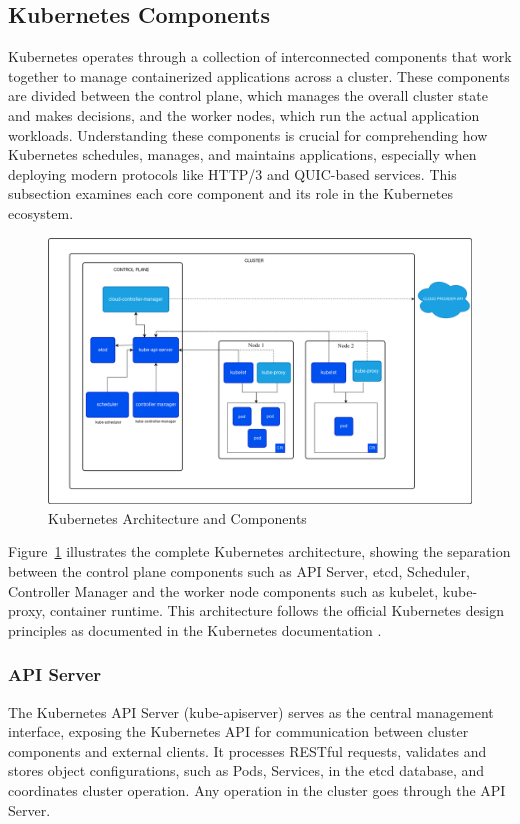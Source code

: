 \subsection{Kubernetes Components}

Kubernetes operates through a collection of interconnected components that work together to manage containerized applications across a cluster. These components are divided between the control plane, which manages the overall cluster state and makes decisions, and the worker nodes, which run the actual application workloads. Understanding these components is crucial for comprehending how Kubernetes schedules, manages, and maintains applications, especially when deploying modern protocols like HTTP/3 and QUIC-based services. This subsection examines each core component and its role in the Kubernetes ecosystem.

\begin{figure}[H]
\centering
\includegraphics[width=1\textwidth]{SOA/kubernetes-cluster-architecture.png}
\caption{Kubernetes Architecture and Components}
\label{fig:k8s-architecture}
\end{figure}

Figure~\ref{fig:k8s-architecture} illustrates the complete Kubernetes architecture, showing the separation between the control plane components such as API Server, etcd, Scheduler, Controller Manager and the worker node components such as kubelet, kube-proxy, container runtime. This architecture follows the official Kubernetes design principles as documented in the Kubernetes documentation \cite{kubernetes-docs}.

\subsubsection{API Server}
The Kubernetes API Server (kube-apiserver) serves as the central management interface, exposing the Kubernetes API for communication between cluster components and external clients. It processes RESTful requests, validates and stores object configurations, such as Pods, Services, in the etcd database, and coordinates cluster operation. Any operation in the cluster goes through the API Server.


